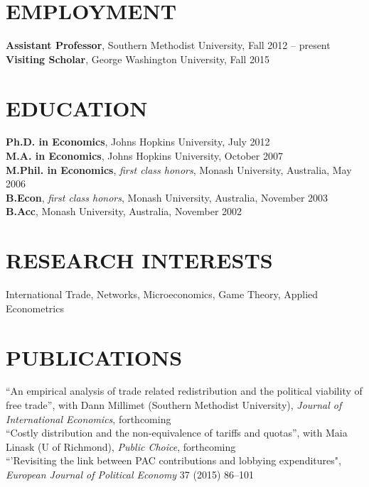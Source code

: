 \documentclass[11pt]{res}
\begin{document}
\begin{resume}
\hspace{-0.5in}\makebox[6.1in]{\hrulefill}

\section{EMPLOYMENT} \vspace{1.5mm}
{\bf Assistant Professor}, Southern Methodist University, Fall 2012 -- present\vspace{.5mm}\\
{\bf Visiting Scholar}, George Washington University, Fall 2015


\section{EDUCATION} \vspace{1.5mm}
    {\bf Ph.D. in Economics}, Johns Hopkins University, July 2012 \vspace{.5mm}\\
    {\bf M.A. in Economics}, Johns Hopkins University, October 2007\vspace{1.5mm}\\
    {\bf M.Phil. in Economics}, \emph{first class honors}, Monash University, Australia, May 2006\vspace{1.5mm}\\
    {\bf B.Econ}, \emph{first class honors}, Monash University, Australia, November 2003\vspace{1.5mm}\\
    {\bf B.Acc}, Monash University, Australia, November 2002


\section{RESEARCH INTERESTS}\vspace{1.5mm}
International Trade, Networks, Microeconomics, Game Theory, Applied Econometrics

\section{PUBLICATIONS}\vspace{1.5mm}
{``An empirical analysis of trade related redistribution and the political viability of free trade''}, with Dann Millimet (Southern Methodist University), \emph{Journal of International Economics}, forthcoming \vspace{1.5mm}\\
{``Costly distribution and the non-equivalence of tariffs and quotas''}, with Maia Linask (U of Richmond), \emph{Public Choice}, forthcoming \vspace{1.5mm}\\
{``'Revisiting the link between PAC contributions and lobbying expenditures", \emph{European Journal of Political Economy}} 37 (2015) 86--101 \vspace{1.5mm}\\


\end{resume}
\end{document}
